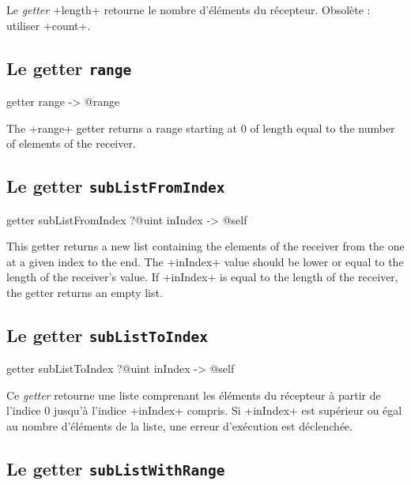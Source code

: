 Le \emph{getter} \ggs+length+ retourne le nombre d'éléments du récepteur. Obsolète : utiliser \ggs+count+.


\subsection{Le getter \texttt{range}}

\begin{galgas}
getter range -> @range
\end{galgas}

The \ggs+range+ getter returns a range starting at $0$ of length equal to the number of elements of the receiver.




\subsection{Le getter \texttt{subListFromIndex}}

\begin{galgas}
getter subListFromIndex ?@uint inIndex -> @self
\end{galgas}

This getter returns a new list containing the elements of the receiver from the one at a given index to the end. The  \ggs+inIndex+ value should be lower or equal to the length of the receiver's value. If \ggs+inIndex+ is equal to the length of the receiver, the getter returns an empty list.






\subsection{Le getter \texttt{subListToIndex}}

\begin{galgas}
getter subListToIndex ?@uint inIndex -> @self
\end{galgas}

Ce \emph{getter} retourne une liste comprenant les éléments du récepteur à partir de l'indice $0$ jusqu'à l'indice \ggs+inIndex+ compris. Si \ggs+inIndex+ est supérieur ou égal au nombre d'éléments de la liste, une erreur d'exécution est déclenchée.




\subsection{Le getter \texttt{subListWithRange}}

